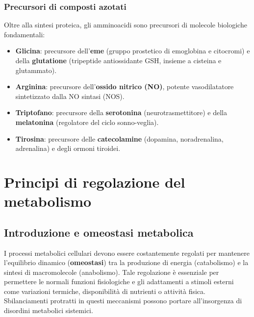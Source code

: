 \documentclass[12pt,a4paper]{report}
\begin{document}
\subsection{Precursori di composti azotati}
Oltre alla sintesi proteica, gli amminoacidi sono precursori di molecole biologiche fondamentali:
\begin{itemize}
\item \textbf{Glicina}: precursore dell'\textbf{eme} (gruppo prostetico di emoglobina e citocromi) e della \textbf{glutatione} (tripeptide antiossidante GSH, insieme a cisteina e glutammato).
\item \textbf{Arginina}: precursore dell'\textbf{ossido nitrico (NO)}, potente vasodilatatore sintetizzato dalla NO sintasi (NOS).
\item \textbf{Triptofano}: precursore della \textbf{serotonina} (neurotrasmettitore) e della \textbf{melatonina} (regolatore del ciclo sonno-veglia).
\item \textbf{Tirosina}: precursore delle \textbf{catecolamine} (dopamina, noradrenalina, adrenalina) e degli ormoni tiroidei.
\end{itemize}

\chapter{Principi di regolazione del metabolismo}
\section{Introduzione e omeostasi metabolica}
I processi metabolici cellulari devono essere costantemente regolati per mantenere l'equilibrio dinamico (\textbf{omeostasi}) tra la produzione di energia (catabolismo) e la sintesi di macromolecole (anabolismo). Tale regolazione è essenziale per permettere le normali funzioni fisiologiche e gli adattamenti a stimoli esterni come variazioni termiche, disponibilità di nutrienti o attività fisica. Sbilanciamenti protratti in questi meccanismi possono portare all'insorgenza di disordini metabolici sistemici.
\end{document}
